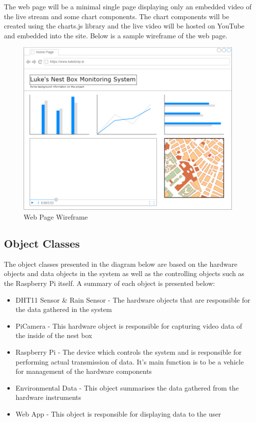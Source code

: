 \documentclass[10pt,a4paper]{article}
\begin{document}
The web page will be a minimal single page displaying only an embedded video of the live stream and some chart components. The chart components will be created using the charts.js library and the live video will be hosted on YouTube and embedded into the site. Below is a sample wireframe of the web page. 

\begin{figure}[H]
\centering
  \includegraphics[width=\linewidth]{images/web_page_mock_up.png}
  \caption{Web Page Wireframe}
  \label{fig:webwireframe}
\end{figure}

\subsection{Object Classes}
The object classes presented in the diagram below are based on the hardware objects and data objects in the system as well as the controlling objects such as the Raspberry Pi itself. A summary of each object is presented below:
\begin{itemize}
\item DHT11 Sensor \& Rain Sensor - The hardware objects that are responsible for the data gathered in the system
\item PiCamera - This hardware object is responsible for capturing video data of the inside of the nest box
\item Raspberry Pi - The device which controls the system and is responsible for performing actual transmission of data. It's main function is to be a vehicle for management of the hardware components
\item Environmental Data - This object summarises the data gathered from the hardware instruments
\item Web App - This object is responsible for displaying data to the user 
\end{itemize}
\end{document}
